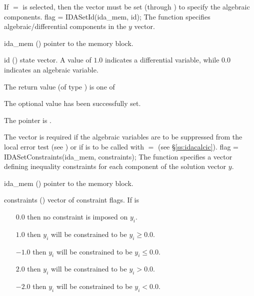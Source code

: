 {{  If $=$ is selected, then the  vector
  must be set (through ) to specify the algebraic components.
}
{
flag = IDASetId(ida\_mem, id);
}
{
  The function  specifies algebraic/differential
  components in the $y$ vector.
}
{
  \begin{args}
  \item[ida\_mem] ()
    pointer to the {\ida} memory block.
  \item[id] ()
    state vector. A value of $1.0$ indicates a differential variable, while
    $0.0$ indicates an algebraic variable.
  \end{args}
}
{
  The return value  (of type ) is one of
  \begin{args}
  \item[\Id{IDA\_SUCCESS}] 
    The optional value has been successfully set.
  \item[\Id{IDA\_MEM\_NULL}]
    The  pointer is .
  \end{args}
}
{
  The vector  is required if the algebraic variables are to be 
  suppressed from the local error test (see ) or
  if  is to be called with  $=$ 
  (see \S\ref{ss:idacalcic}).
}
{
flag = IDASetConstraints(ida\_mem, constraints);
}
{
  The function  specifies a vector defining
  inequality constraints for each component of the solution vector $y$.
}
{
  \begin{args}
  \item[ida\_mem] ()
    pointer to the {\ida} memory block.
  \item[constraints] ()
    vector of constraint flags. If  is
    \begin{itemize}    
    \item[$0.0$] then no constraint is imposed on $y_i$. 
    \item[$1.0$] then $y_i$ will be constrained to be $y_i \ge 0.0$.
    \item[$-1.0$] then $y_i$ will be constrained to be $y_i \le 0.0$.
    \item[$2.0$] then $y_i$ will be constrained to be $y_i > 0.0$.
    \item[$-2.0$] then $y_i$ will be constrained to be $y_i < 0.0$.
    \end{itemize}

\end{args}}}
